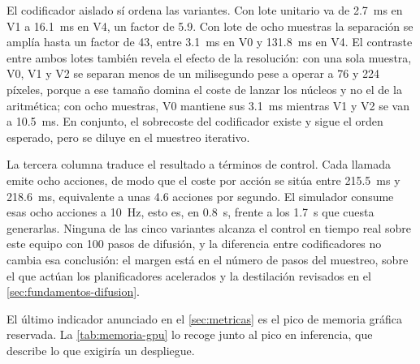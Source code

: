 El codificador aislado s\'i ordena las variantes. Con lote unitario va de
\SI{2.7}{\milli\second} en V1 a \SI{16.1}{\milli\second} en V4, un factor de \num{5.9}.
Con lote de ocho muestras la separaci\'on se ampl\'ia hasta un factor de \num{43}, entre
\SI{3.1}{\milli\second} en V0 y \SI{131.8}{\milli\second} en V4. El contraste entre ambos
lotes tambi\'en revela el efecto de la resoluci\'on: con una sola muestra, V0, V1 y V2 se
separan menos de un milisegundo pese a operar a \num{76} y \num{224} p\'ixeles, porque a
ese tama\~no domina el coste de lanzar los n\'ucleos y no el de la aritm\'etica; con ocho
muestras, V0 mantiene sus \SI{3.1}{\milli\second} mientras V1 y V2 se van a
\SI{10.5}{\milli\second}. En conjunto, el sobrecoste del codificador existe y sigue el
orden esperado, pero se diluye en el muestreo iterativo.

La tercera columna traduce el resultado a t\'erminos de control. Cada llamada emite ocho
acciones, de modo que el coste por acci\'on se sit\'ua entre \SI{215.5}{\milli\second} y
\SI{218.6}{\milli\second}, equivalente a unas \num{4.6} acciones por segundo. El
simulador consume esas ocho acciones a \SI{10}{\hertz}, esto es, en \SI{0.8}{\second},
frente a los \SI{1.7}{\second} que cuesta generarlas. Ninguna de las cinco variantes
alcanza el control en tiempo real sobre este equipo con \num{100} pasos de difusi\'on, y la
diferencia entre codificadores no cambia esa conclusi\'on: el margen est\'a en el n\'umero
de pasos del muestreo, sobre el que act\'uan los planificadores acelerados y la
destilaci\'on revisados en el \cref{sec:fundamentos-difusion}.


El \'ultimo indicador anunciado en el \cref{sec:metricas} es el pico de memoria gr\'afica
reservada. La \cref{tab:memoria-gpu} lo recoge junto al pico en inferencia, que describe lo
que exigir\'ia un despliegue.


